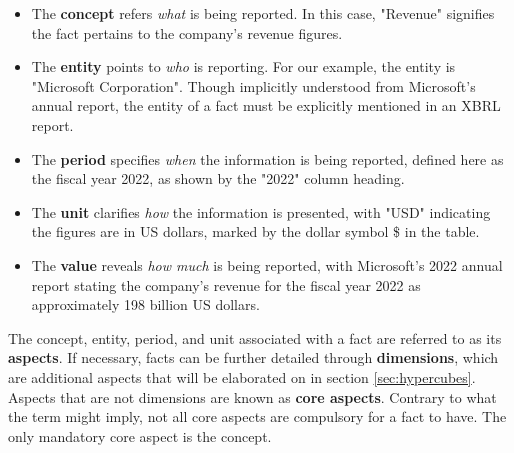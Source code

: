 \begin{itemize}
    \item The \textbf{concept} refers \textit{what} is being reported. 
    In this case, "Revenue" signifies the fact pertains to the company's revenue figures.
    \item The \textbf{entity} points to \textit{who} is reporting. 
    For our example, the entity is "Microsoft Corporation".
    Though implicitly understood from Microsoft's annual report,
    the entity of a fact must be explicitly mentioned in an XBRL report.
    \item The \textbf{period} specifies \textit{when} the information is being reported,
    defined here as the fiscal year 2022, as shown by the "2022" column heading.
    \item The \textbf{unit} clarifies \textit{how} the information is presented,
    with "USD" indicating the figures are in US dollars,
    marked by the dollar symbol \$ in the table.
    \item The \textbf{value} reveals \textit{how much} is being reported,
    with Microsoft's 2022 annual report stating the company's revenue for the fiscal year 2022 as approximately 198 billion US dollars.
\end{itemize}


The concept, entity, period, and unit associated with a fact are referred to as its \textbf{aspects}.
If necessary, facts can be further detailed through \textbf{dimensions}, which are additional aspects that will be elaborated on in section \ref{sec:hypercubes}.
Aspects that are not dimensions are known as \textbf{core aspects}.
Contrary to what the term might imply, not all core aspects are compulsory for a fact to have.
The only mandatory core aspect is the concept.